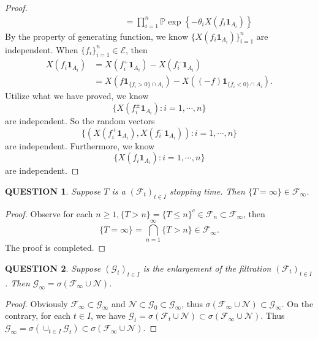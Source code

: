\documentclass[12pt]{article}
\renewcommand{\i}{\bm{1}}
\renewcommand{\(}{\left(}%
\renewcommand{\)}{\right)}%
\renewcommand{\[}{\left[}%
\renewcommand{\]}{\right]}%
\newcommand{\p}{\mathbb{P}}
\newcommand{\f}{\mathscr{F}}
\newcommand{\g}{\mathscr{G}}
\newtheorem{question}{QUESTION}[section]}
\newtheorem{proof}{Proof.}}
\begin{document}
\begin{proof}
\begin{equation*}
\begin{split}
     &\qquad\qquad\qquad =\prod_{i=1}^n\p\exp \left\{- \theta_iX(f_{i}\i_{A_i})\right\}
    \end{split}
   \end{equation*}
   By the property of generating function, we know $\{X(f_i\i_{A_i})\}_{i=1}^n$ are independent. When $\{f_i\}_{i=1}^n\in\mathscr{E}$, then
   \begin{equation*}
    \begin{split}
     X(f_i\i_{A_i})&=X(f_i^+\i_{A_i})-X(f_i^-\i_{A_i})\\
     &=X(f\i_{\{f_i>0\}\cap A_i})-X((-f)\i_{\{f_i<0\}\cap A_i}).
    \end{split}
   \end{equation*}
   Utilize what we have proved, we know
   \begin{equation*}
    \{X(f_i^\pm \i_{A_i}):i=1,\cdots,n \}
   \end{equation*}
   are independent. So the random vectors
   \begin{equation*}
    \{(X(f_i^+ \i_{A_i}),X(f_i^- \i_{A_i})):i=1,\cdots,n \}
   \end{equation*}
   are independent. Furthermore, we know
   \begin{equation*}
    \{X(f_i\i_{A_i}):i=1,\cdots,n\}
   \end{equation*}
   are independent.
  \end{proof}

  \begin{question}
   Suppose $T$ is a $(\f_t)_{t\in I}$ stopping time. Then $\{T=\infty\}\in\f_\infty$.
  \end{question}
  \begin{proof}
   Observe for each $n\geq 1,\{T>n\}=\{T\leq n\}^c\in\f_n\subset\f_{\infty}$, then
   \begin{equation*}
    \{T=\infty \}=\bigcap_{n=1}^\infty \{T>n\}\in\f_\infty.
   \end{equation*}
   The proof is completed.
  \end{proof}

  \begin{question}
   Suppose $(\g_t)_{t\in I}$ is the enlargement of the filtration $(\f_t)_{t\in I}$. Then $\g_\infty=\sigma(\f_\infty\cup\mathscr{N} )$.
  \end{question}
  \begin{proof}
   Obviously $\f_\infty\subset  \g_\infty$ and $\mathscr{N}\subset\g_0\subset\g_\infty$, thus $\sigma(\f_\infty\cup\mathscr{N} )\subset\g_\infty$. On the contrary, for each $t\in I$, we have $\g_t=\sigma(\f_t\cup\mathscr{N} )\subset \sigma(\f_\infty\cup\mathscr{N} )$. Thus $\g_\infty=\sigma(\cup_{t\in I}\g_t)\subset \sigma(\f_\infty\cup\mathscr{N} )$.
  \end{proof}
\end{document}
